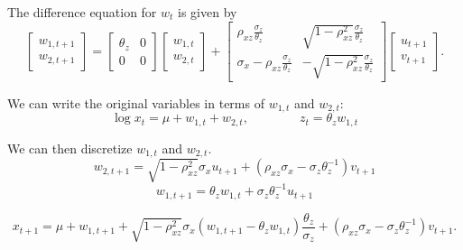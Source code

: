 The difference equation for $w_t$ is given by
\begin{equation}
    \left[
    \begin{matrix}
        w_{1,t+1}\\
        w_{2,t+1}
    \end{matrix}
    \right] = \left[ 
    \begin{matrix}
        \theta_z & 0\\
        0 & 0
    \end{matrix}
    \right] 
    \left[
    \begin{matrix}
        w_{1,t}\\
        w_{2,t}
    \end{matrix}
    \right] +
     \left[ 
    \begin{matrix}
        \rho_{xz} \frac{\sigma_{z}}{\theta_z} & \sqrt{1 - \rho_{xz}^2}\frac{\sigma_{z}}{\theta_z}\\
          \sigma_x - \rho_{xz} \frac{\sigma_z }{\theta_z}& -\sqrt{1 - \rho_{xz}^2}\frac{\sigma_{z}}{\theta_z}
    \end{matrix}
    \right]
\left[
    \begin{matrix}
        u_{t+1}\\
        v_{t+1}
    \end{matrix}
    \right].
\end{equation}

We can write the original variables in terms of $w_{1,t}$ and $w_{2,t}$:
\begin{equation}
    \log x_t = \mu + w_{1,t} + w_{2,t}, \qquad \qquad 
    z_t = \theta_z w_{1,t}
\end{equation}

We can then discretize $w_{1,t}$ and $w_{2,t}$.
\begin{equation}
    w_{2,t+1} = \sqrt{1 - \rho_{xz}^2}\sigma_{x} u_{t+1} + (\rho_{xz} \sigma_x - \sigma_z \theta_z^{-1} )v_{t+1}
\end{equation}
\begin{equation}
    w_{1,t+1} = \theta_z w_{1,t} + \sigma_z \theta_z^{-1} u_{t+1}
\end{equation}

\begin{equation}
    x_{t+1} = \mu + w_{1,t+1} + \sqrt{1 - \rho_{xz}^2}\sigma_{x} (w_{1,t+1}  - \theta_z w_{1,t}  ) \frac{\theta_z}{\sigma_z} + (\rho_{xz} \sigma_x - \sigma_z \theta_z^{-1} )v_{t+1}.
\end{equation}




